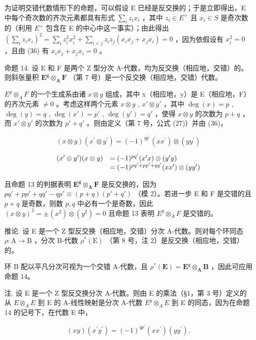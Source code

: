 为证明交错代数情形下的命题，可以假设 E 已经是反交换的；于是立即得出，E 中每个奇次数的齐次元素都具有形式 \(\sum_{i} z_{i} x_{i}\) ，其中 \(z_{i} \in E^{+}\) 且 \(x_{i} \in S\) 是奇次数的（利用 \(E^{+}\) 包含在 E 的中心中这一事实）；由此得出 \(\left(\sum_{i} z_{i} x_{i}\right)^{2} = \sum_{i} z_{i}^{2} x_{i}^{2} + \sum_{i < j} z_{i} z_{j} (x_{i} x_{j} + x_{j} x_{i}) = 0\) ，因为依假设有 \(x_{i}^{2} = 0\) ，且由 (36) 有 \(x_{i} x_{j} + x_{j} x_{i} = 0\) 。

命题 14. 设 E 和 F 是两个 Z 型分次 A-代数，均为反交换（相应地，交错）的。则斜张量积 \(\mathbf{E}^{\mathbf{g}}\otimes_{\mathbf{A}}\mathbf{F}\) （第 7 号）是一个反交换（相应地，交错）代数。

\(E^{g} \otimes_{A} F\) 的一个生成系由诸 \(x \otimes y\) 组成，其中 x（相应地，y）是 E（相应地，F）的齐次元素 \(\neq 0\) 。考虑这样两个元素 \(x \otimes y\) , \(x' \otimes y'\) ，其中 \(\deg(x) = p\) , \(\deg(y) = q\) , \(\deg(x') = p'\) , \(\deg(y') = q'\) ，使得 \(x \otimes y\) 的次数为 \(p + q\) ，而 \(x' \otimes y'\) 的次数为 \(p' + q'\) 。则由定义（第 7 号，公式 (27)）并由 (36)，

\[
(x \otimes y) (x ^ {\prime} \otimes y ^ {\prime}) = (- 1) ^ {q p ^ {\prime}} (x x ^ {\prime}) \otimes (y y ^ {\prime})
\]

\[
\begin{array}{r l} (x ^ {\prime} \otimes y ^ {\prime}) (x \otimes y) & = (- 1) ^ {p q ^ {\prime}} (x ^ {\prime} x) \otimes (y ^ {\prime} y) \\ & = (- 1) ^ {p q ^ {\prime} + p p ^ {\prime} + q q ^ {\prime}} (x x ^ {\prime}) \otimes (y y ^ {\prime}) \end{array}
\]

且命题 13 的判据表明 \(\mathbf{E}^{\mathbf{g}}\otimes_{\mathbf{A}}\mathbf{F}\) 是反交换的，因为 \(pq' + p p' + qq' - q p' \equiv (p + q)(p' + q')\) （模 2）。若进一步 E 和 F 是交错的且 \(p + q\) 是奇数，则数 \(p, q\) 中必有一个是奇数，因此 \((x \otimes y)^2 = \pm (x^2) \otimes (y^2) = 0\) 且命题 13 表明 \(E^g \otimes_A F\) 是交错的。

推论. 设 E 是一个 Z 型反交换（相应地，交错）分次 A-代数。则对每个环同态 \(\rho: \mathrm{A} \to \mathrm{B}\) ，分次 B-代数 \(\rho^{*}(\mathrm{E})\) （第 8 号，注 2）是反交换（相应地，交错）的。

环 B 配以平凡分次可视为一个交错 A-代数，且 \(\rho^{*}(\mathbf{E}) = \mathbf{E}^{\mathfrak{g}}\otimes_{\mathbf{A}}\mathbf{B}\) ，因此可应用命题 14。

注. 设 E 是一个 Z 型反交换分次 A-代数。则由 E 的乘法（§1，第 3 号）定义的从 \(E \otimes_{A} E\) 到 E 的 A-线性映射是分次 A-代数 \(E^{g} \otimes_{A} E\) 到 E 的同态，因为在命题 14 的记号下，在代数 E 中，

\[
(x y) (x ^ {\prime} y ^ {\prime}) = (- 1) ^ {q p ^ {\prime}} (x x ^ {\prime}) (y y ^ {\prime}).
\]

